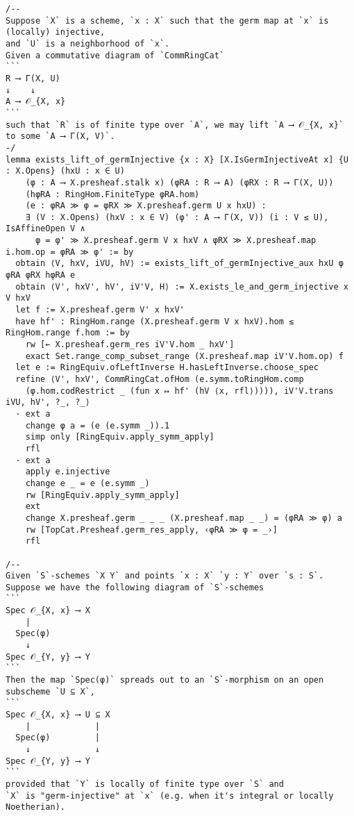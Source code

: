 \documentclass{article}
\begin{document}
\begin{lstlisting}[language=Lean, caption={SpreadingOut.lean}]
/--
Suppose `X` is a scheme, `x : X` such that the germ map at `x` is (locally) injective,
and `U` is a neighborhood of `x`.
Given a commutative diagram of `CommRingCat`
```
R ⟶ Γ(X, U)
↓    ↓
A ⟶ 𝒪_{X, x}
```
such that `R` is of finite type over `A`, we may lift `A ⟶ 𝒪_{X, x}` to some `A ⟶ Γ(X, V)`.
-/
lemma exists_lift_of_germInjective {x : X} [X.IsGermInjectiveAt x] {U : X.Opens} (hxU : x ∈ U)
    (φ : A ⟶ X.presheaf.stalk x) (φRA : R ⟶ A) (φRX : R ⟶ Γ(X, U))
    (hφRA : RingHom.FiniteType φRA.hom)
    (e : φRA ≫ φ = φRX ≫ X.presheaf.germ U x hxU) :
    ∃ (V : X.Opens) (hxV : x ∈ V) (φ' : A ⟶ Γ(X, V)) (i : V ≤ U), IsAffineOpen V ∧
      φ = φ' ≫ X.presheaf.germ V x hxV ∧ φRX ≫ X.presheaf.map i.hom.op = φRA ≫ φ' := by
  obtain ⟨V, hxV, iVU, hV⟩ := exists_lift_of_germInjective_aux hxU φ φRA φRX hφRA e
  obtain ⟨V', hxV', hV', iV'V, H⟩ := X.exists_le_and_germ_injective x V hxV
  let f := X.presheaf.germ V' x hxV'
  have hf' : RingHom.range (X.presheaf.germ V x hxV).hom ≤ RingHom.range f.hom := by
    rw [← X.presheaf.germ_res iV'V.hom _ hxV']
    exact Set.range_comp_subset_range (X.presheaf.map iV'V.hom.op) f
  let e := RingEquiv.ofLeftInverse H.hasLeftInverse.choose_spec
  refine ⟨V', hxV', CommRingCat.ofHom (e.symm.toRingHom.comp
    (φ.hom.codRestrict _ (fun x ↦ hf' (hV ⟨x, rfl⟩)))), iV'V.trans iVU, hV', ?_, ?_⟩
  · ext a
    change φ a = (e (e.symm _)).1
    simp only [RingEquiv.apply_symm_apply]
    rfl
  · ext a
    apply e.injective
    change e _ = e (e.symm _)
    rw [RingEquiv.apply_symm_apply]
    ext
    change X.presheaf.germ _ _ _ (X.presheaf.map _ _) = (φRA ≫ φ) a
    rw [TopCat.Presheaf.germ_res_apply, ‹φRA ≫ φ = _›]
    rfl

/--
Given `S`-schemes `X Y` and points `x : X` `y : Y` over `s : S`.
Suppose we have the following diagram of `S`-schemes
```
Spec 𝒪_{X, x} ⟶ X
    |
  Spec(φ)
    ↓
Spec 𝒪_{Y, y} ⟶ Y
```
Then the map `Spec(φ)` spreads out to an `S`-morphism on an open subscheme `U ⊆ X`,
```
Spec 𝒪_{X, x} ⟶ U ⊆ X
    |             |
  Spec(φ)         |
    ↓             ↓
Spec 𝒪_{Y, y} ⟶ Y
```
provided that `Y` is locally of finite type over `S` and
`X` is "germ-injective" at `x` (e.g. when it's integral or locally Noetherian).


\end{lstlisting}
\end{document}
